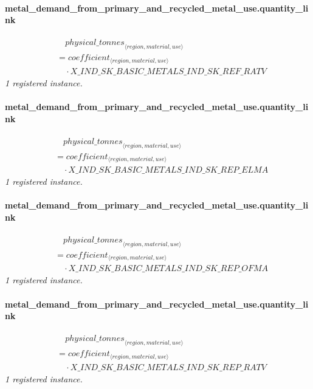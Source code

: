 \documentclass[11pt]{article}
\begin{document}
\paragraph{metal\_demand\_from\_primary\_and\_recycled\_metal\_use.quantity\_link}
\begin{align*}
&\quad {physical\_tonnes}_{\langle region, material, use\rangle}\\
&= coefficient_{\langle region, material, use\rangle}\\
&\quad {}\cdot X\_IND\_SK\_BASIC\_METALS\_IND\_SK\_REF\_RATV
\end{align*}
\noindent\emph{1 registered instance.}\par
\paragraph{metal\_demand\_from\_primary\_and\_recycled\_metal\_use.quantity\_link}
\begin{align*}
&\quad {physical\_tonnes}_{\langle region, material, use\rangle}\\
&= coefficient_{\langle region, material, use\rangle}\\
&\quad {}\cdot X\_IND\_SK\_BASIC\_METALS\_IND\_SK\_REP\_ELMA
\end{align*}
\noindent\emph{1 registered instance.}\par
\paragraph{metal\_demand\_from\_primary\_and\_recycled\_metal\_use.quantity\_link}
\begin{align*}
&\quad {physical\_tonnes}_{\langle region, material, use\rangle}\\
&= coefficient_{\langle region, material, use\rangle}\\
&\quad {}\cdot X\_IND\_SK\_BASIC\_METALS\_IND\_SK\_REP\_OFMA
\end{align*}
\noindent\emph{1 registered instance.}\par
\paragraph{metal\_demand\_from\_primary\_and\_recycled\_metal\_use.quantity\_link}
\begin{align*}
&\quad {physical\_tonnes}_{\langle region, material, use\rangle}\\
&= coefficient_{\langle region, material, use\rangle}\\
&\quad {}\cdot X\_IND\_SK\_BASIC\_METALS\_IND\_SK\_REP\_RATV
\end{align*}
\noindent\emph{1 registered instance.}\par
\end{document}
